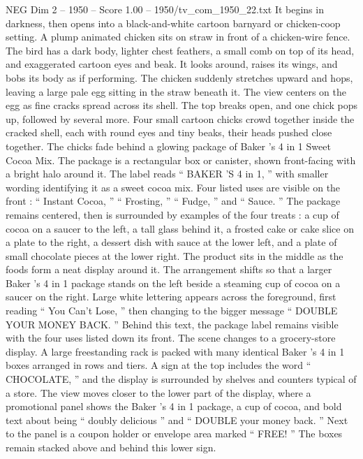 \begin{textsample}{NEG Dim 2 – 1950 – Score 1.00 – 1950/tv\_com\_1950\_22.txt}  \label{ex:f2_neg_017}
It begins in darkness, then opens into a black-and-white cartoon barnyard or chicken-coop setting.
A plump animated chicken sits on straw in front of a chicken-wire fence.
The bird has a dark body, lighter chest feathers, a small comb on top of its head, and exaggerated cartoon eyes and beak.
It looks around, raises its wings, and bobs its body as if performing.
The chicken suddenly stretches upward and hops, leaving a large pale egg sitting in the straw beneath it.
The view centers on the egg as fine cracks spread across its shell.
The top breaks open, and one chick pops up, followed by several more.
Four small cartoon chicks crowd together inside the cracked shell, each with round eyes and tiny beaks, their heads pushed close together.
The chicks fade behind a glowing package of Baker ’s 4 in 1 Sweet Cocoa Mix.
The package is a rectangular box or canister, shown front-facing with a bright halo around it.
The label reads “ BAKER ’S 4 in 1, ” with smaller wording identifying it as a sweet cocoa mix.
Four listed uses are visible on the front : “ Instant Cocoa, ” “ Frosting, ” “ Fudge, ” and “ Sauce. ” The package remains centered, then is surrounded by examples of the four treats : a cup of cocoa on a saucer to the left, a tall glass behind it, a frosted cake or cake slice on a plate to the right, a dessert dish with sauce at the lower left, and a plate of small chocolate pieces at the lower right.
The product sits in the middle as the foods form a neat display around it.
The arrangement shifts so that a larger Baker ’s 4 in 1 package stands on the left beside a steaming cup of cocoa on a saucer on the right.
Large white lettering appears across the foreground, first reading “ You Can't Lose, ” then changing to the bigger message “ DOUBLE YOUR MONEY BACK. ” Behind this text, the package label remains visible with the four uses listed down its front.
The scene changes to a grocery-store display.
A large freestanding rack is packed with many identical Baker ’s 4 in 1 boxes arranged in rows and tiers.
A sign at the top includes the word “ CHOCOLATE, ” and the display is surrounded by shelves and counters typical of a store.
The view moves closer to the lower part of the display, where a promotional panel shows the Baker ’s 4 in 1 package, a cup of cocoa, and bold text about being “ doubly delicious ” and “ DOUBLE your money back. ” Next to the panel is a coupon holder or envelope area marked “ FREE! ” The boxes remain stacked above and behind this lower sign.

\end{textsample}
